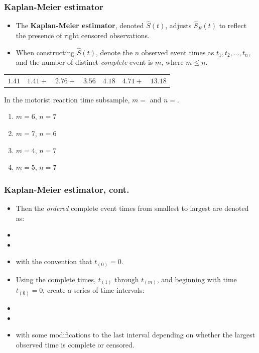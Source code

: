 \begin{frame}
\frametitle{Kaplan-Meier estimator}
\begin{itemize}
\item The \textbf{Kaplan-Meier estimator}, denoted $\widehat{S}(t)$, adjusts $\widehat{S}_E(t)$ to reflect the presence of right censored observations.
\item When constructing $\widehat{S}(t)$, denote the $n$ observed event times as $t_1, t_2, \ldots, t_n$, and the number of distinct \textit{complete} event is $m$, where $m \leq n$.
\end{itemize}
\begin{center}
\begin{tabular}{ccccccc}
$1.41$ & $1.41+$ & $2.76+$ & $3.56$ & $4.18$ &  $4.71+$   & $13.18$ \\
\end{tabular}
\end{center}
\begin{clicker}{In the motorist reaction time subsample, $m=$\underline{\hspace{0.5in}} and $n=$\underline{\hspace{0.5in}}.}
\begin{enumerate}
\item $m=6$, $n=7$
\item $m=7$, $n=6$
\item $m=4$, $n=7$ %
\item $m=5$, $n=7$
\end{enumerate}
\end{clicker}
\end{frame}


\begin{frame}
\frametitle{Kaplan-Meier estimator, cont.}
\begin{itemize}
\item Then the \textit{ordered} complete event times from smallest to largest are denoted as:
\item[]
\item[]
\item[] with the convention that $t_{(0)}=0$.
\item Using the complete times, $t_{(1)}$ through $t_{(m)}$, and beginning with time $t_{(0)}=0$, create a series of time intervals:
\item[]
\item[]   %
\item[]   with some modifications to the last interval depending on whether the largest observed time is complete or censored.
\end{itemize}
\end{frame}


